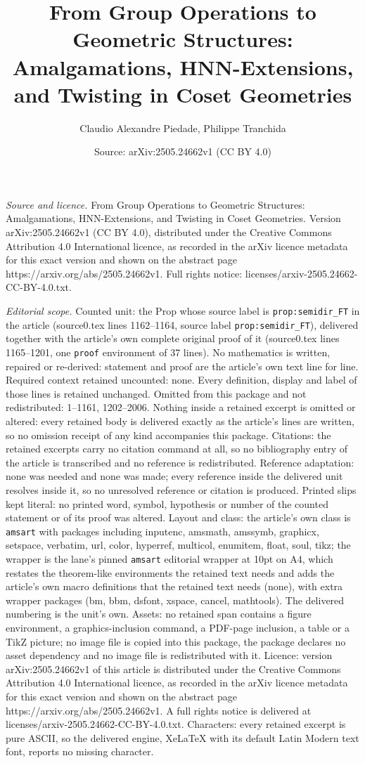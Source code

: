 \documentclass[10pt,a4paper]{amsart}
\title[From Group Operations to Geometric Structures: Amalgamations]{From Group Operations to Geometric Structures: Amalgamations, HNN-Extensions, and Twisting in Coset Geometries}
\author{Claudio Alexandre Piedade, Philippe Tranchida}
\date{Source: arXiv:2505.24662v1 (CC BY 4.0)}
\begin{document}
\maketitle

\noindent\emph{Source and licence.} From Group Operations to Geometric Structures: Amalgamations, HNN-Extensions, and Twisting in Coset Geometries. Version arXiv:2505.24662v1 (CC BY 4.0), distributed under the Creative Commons Attribution 4.0 International licence, as recorded in the arXiv licence metadata for this exact version and shown on the abstract page https://arxiv.org/abs/2505.24662v1. Full rights notice: licenses/arxiv-2505.24662-CC-BY-4.0.txt.\par\smallskip

\noindent\textit{Editorial scope.} Counted unit: the Prop whose source label is \texttt{prop:semidir\_FT} in the article (source0.tex lines 1162--1164, source label \texttt{prop:semidir\_FT}), delivered together with the article's own complete original proof of it (source0.tex lines 1165--1201, one \texttt{proof} environment of 37 lines). No mathematics is written, repaired or re-derived: statement and proof are the article's own text line for line. Required context retained uncounted: none. Every definition, display and label of those lines is retained unchanged. Omitted from this package and not redistributed: 1--1161, 1202--2006. Nothing inside a retained excerpt is omitted or altered: every retained body is delivered exactly as the article's lines are written, so no omission receipt of any kind accompanies this package. Citations: the retained excerpts carry no citation command at all, so no bibliography entry of the article is transcribed and no reference is redistributed. Reference adaptation: none was needed and none was made; every reference inside the delivered unit resolves inside it, so no unresolved reference or citation is produced. Printed slips kept literal: no printed word, symbol, hypothesis or number of the counted statement or of its proof was altered. Layout and class: the article's own class is \texttt{amsart} with packages including inputenc, amsmath, amssymb, graphicx, setspace, verbatim, url, color, hyperref, multicol, enumitem, float, soul, tikz; the wrapper is the lane's pinned \texttt{amsart} editorial wrapper at 10pt on A4, which restates the theorem-like environments the retained text needs and adds the article's own macro definitions that the retained text needs (none), with extra wrapper packages (bm, bbm, dsfont, xspace, cancel, mathtools). The delivered numbering is the unit's own. Assets: no retained span contains a figure environment, a graphics-inclusion command, a PDF-page inclusion, a table or a TikZ picture; no image file is copied into this package, the package declares no asset dependency and no image file is redistributed with it. Licence: version arXiv:2505.24662v1 of this article is distributed under the Creative Commons Attribution 4.0 International licence, as recorded in the arXiv licence metadata for this exact version and shown on the abstract page https://arxiv.org/abs/2505.24662v1. A full rights notice is delivered at licenses/arxiv-2505.24662-CC-BY-4.0.txt. Characters: every retained excerpt is pure ASCII, so the delivered engine, XeLaTeX with its default Latin Modern text font, reports no missing character.
\end{document}
